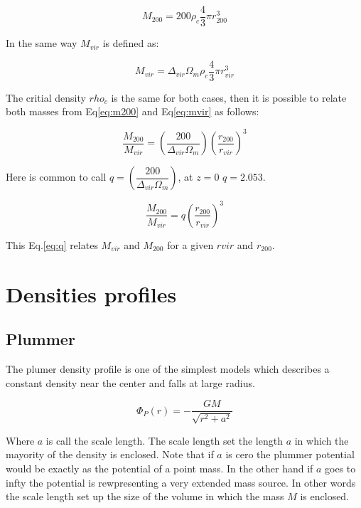 \documentclass[a4paper, 12pt]{article} %
\begin{document}
\begin{equation}\label{eq:m200}
M_{200} = 200 \rho_c \dfrac{4}{3} \pi r_{200}^3
\end{equation}

In the same way $M_{vir}$ is defined as:

\begin{equation}\label{eq:mvir}
M_{vir} = \Delta_{vir} \Omega_m \rho_c \dfrac{4}{3} \pi r_{vir}^3
\end{equation}

The critial density $rho_c$ is the same for both cases, then it is possible
to relate both masses from Eq\ref{eq:m200} and Eq\ref{eq:mvir} as follows:

\begin{equation}
\dfrac{M_{200}}{M_{vir}} = \left(  \dfrac{200}{ \Delta_{vir} \Omega_m}  \right) \left( \dfrac{r_{200}}{r_{vir}}  \right)^3
\end{equation}

Here is common to call $q = \left(  \dfrac{200}{ \Delta_{vir} \Omega_m}  \right) $,  at $z=0$ $q=2.053$.

\begin{equation}\label{eq:q}
\dfrac{M_{200}}{M_{vir}} = q \left( \dfrac{r_{200}}{r_{vir}}  \right)^3
\end{equation}

This Eq.\ref{eq:q} relates $M_{vir}$ and $M_{200}$ for a given $r{vir}$ and $r_{200}$. 

\section{Densities profiles}

\subsection{Plummer}

The plumer density profile is one of the simplest models which describes
a constant density near the center and falls at large radius.

\begin{equation}
\Phi_P(r) = - \frac{GM}{\sqrt{r^2+a^2}}
\end{equation}


Where $a$ is call the scale length. The scale length set the length $a$ in which the mayority of the density is enclosed. Note
that if $a$ is cero the plummer potential would be exactly as the potential of a point mass.
In the other hand if $a$ goes to infty the potential is rewpresenting a very extended mass source.
In other words the scale length set up the size of the volume in which the mass $M$ is enclosed.
\end{document}
